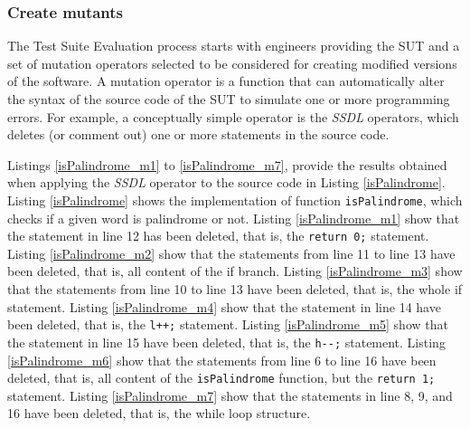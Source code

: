 \subsubsection{Create mutants}

The Test Suite Evaluation process starts with engineers providing the SUT and a set of mutation operators selected to be considered for creating modified versions of the software. 
A mutation operator is a function that can automatically alter the syntax of the source code of the SUT to simulate one or more programming errors.
For example, a conceptually simple operator is the \textit{SSDL} operators, which deletes (or comment out) one or more statements in the source code.



Listings \ref{isPalindrome_m1} to \ref{isPalindrome_m7}, provide the results obtained when applying the \textit{SSDL} operator to the source code in Listing \ref{isPalindrome}.
Listing \ref{isPalindrome} shows the implementation of function \texttt{isPalindrome}, which checks if a given word is palindrome or not.
Listing \ref{isPalindrome_m1} show that the statement in line 12 has been deleted, that is, the \texttt{return 0;} statement.
Listing \ref{isPalindrome_m2} show that the statements from line 11 to line 13 have been deleted, that is, all content of the if branch.
Listing \ref{isPalindrome_m3} show that the statements from line 10 to line 13 have been deleted, that is, the whole if statement.
Listing \ref{isPalindrome_m4} show that the statement in line 14 have been deleted, that is, the \texttt{l++;} statement.
Listing \ref{isPalindrome_m5} show that the statement in line 15 have been deleted, that is, the \texttt{h-}\texttt{-;} statement.
Listing \ref{isPalindrome_m6} show that the statements from line 6 to line 16 have been deleted, that is, all content of the \texttt{isPalindrome} function, but the \texttt{return 1;} statement.
Listing \ref{isPalindrome_m7} show that the statements in line 8, 9, and 16 have been deleted, that is, the while loop structure.











